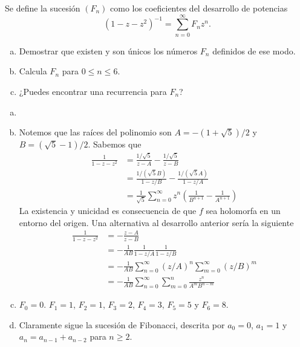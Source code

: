 \documentclass[twoside]{article}
\begin{document}
\newpage
\begin{ejercicio}{2}
Se define la sucesión $(F_n)$ como los coeficientes del desarrollo de potencias 
\[(1-z-z^2)^{-1}=\sum_{n=0}^\infty F_n z^n.\]
\begin{enumerate}[a)]
\item Demostrar que existen y son únicos los números $F_n$ definidos de ese modo.
\item Calcula $F_n$ para $0\le n\le 6$. 
\item ¿Puedes encontrar una recurrencia para $F_n$?
\end{enumerate}
\end{ejercicio}
\begin{solucion}
\begin{enumerate}[a)]
\item[]
\item Notemos que las raíces del polinomio son $A= -(1+\sqrt{5})/2$ y $B=(\sqrt{5}-1)/2$. Sabemos que
\begin{align*}
\frac{1}{1-z-z^2} &= \frac{1/\sqrt{5}}{z-A}-\frac{1/\sqrt{5}}{z-B}\\
&= \frac{1/(\sqrt{5}B)}{1-z/B} - \frac{1/(\sqrt{5}A)}{1-z/A}\\
& = 
\frac{1}{\sqrt{5}}\sum_{n=0}^\infty z^n\left(\frac{1}{B^{n+1}}-\frac{1}{A^{n+1}}\right)
\end{align*}
La existencia y unicidad es consecuencia de que $f$ sea holomorfa en un entorno del origen. Una alternativa al desarrollo anterior sería la siguiente
\begin{align*}
\frac{1}{1-z-z^2}& = -\frac{z-A}{z-B} \\
&=-\frac{1}{AB}\frac{1}{1-z/A}\frac{1}{1-z/B}\\
&= -\frac{1}{AB}\sum_{n=0}^\infty (z/A)^n\sum_{m=0}^\infty (z/B)^m\\
&= -\frac{1}{AB}\sum_{n=0}^\infty \sum_{m=0}^n \frac{z^n}{A^mB^{n-m}}
\end{align*}
\item $F_0 = 0$. $F_1 = 1$, $F_2 = 1$, $F_3 = 2$, $F_4=3$, $F_5=5$ y $F_6 = 8$.
\item Claramente sigue la sucesión de Fibonacci, descrita por $a_0 =0$, $a_1=1$ y $a_n = a_{n-1}+a_{n-2}$ para $n\geq 2$.
\end{enumerate}
\end{solucion}
\end{document}
